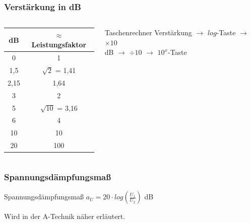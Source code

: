 \begin{frame}
  \frametitle{Verstärkung in dB}
  \begin{columns}
    \begin{center}
      \begin{Large}
        \begin{tabular}{c|c}
          dB & $\approx$ Leistungsfaktor \\
          \hline \hline
          0    & 1                  \\
          1,5  & $\sqrt{2}$ = 1,41  \\
          2,15 & 1,64               \\
          3    & 2                  \\
          5    & $\sqrt{10}$ = 3,16 \\
          6    & 4                  \\
          10   & 10                 \\
          20   & 100                \\
        \end{tabular}
      \end{Large}
    \end{center}
    \begin{block}{Taschenrechner}
      Verstärkung $\rightarrow$ $log$-Taste $\rightarrow$ $\times 10$\\[1.5em]
      dB $\rightarrow$ $\div 10$ $\rightarrow$ $10^x$-Taste
    \end{block}
  \end{columns}
\end{frame}

\begin{frame}
  \frametitle{Spannungs\-dämpfungs\-maß}
  \begin{block}{Spannungsdämpfungsmaß}
    \Huge{$a_{U} = 20 \cdot log(\frac{U_{1}}{U_{2}})$ dB}
  \end{block}
  \vspace{2cm}
  Wird in der A-Technik näher erläutert.
\end{frame}

